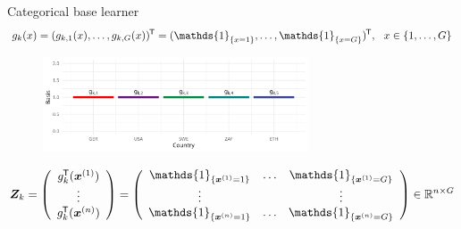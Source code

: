 \documentclass[t,10pt]{beamer}
\begin{document}


\begin{frame}{Categorical base learner}
  \vspace{-0.3cm}\[g_k(x) = (g_{k,1}(x), \dots, g_{k,G}(x))^\tran = (\mathds{1}_{\{x = 1\}}, \dots, \mathds{1}_{\{x = G\}})^\tran, \ \ x\in\{1, \dots, G\}\]
  \begin{center}
    \begin{figure}
      \includegraphics[width=0.7\textwidth]{figures/bs-cat/fig-cat0.png}
    \end{figure}
    \vspace{-0.5cm}
    \[
    \design_k = \left(\begin{array}{c}
      g_{k}^\tran(\xi[1]) \\
      \vdots \\
      g_{k}^\tran(\xi[n])
    \end{array}\right) = \left(\begin{array}{ccc}
      \mathds{1}_{\{\xi[1] = 1\}} & \dots & \mathds{1}_{\{\xi[1] = G\}} \\
      \vdots &  & \vdots \\
      \mathds{1}_{\{\xi[n] = 1\}} & \dots & \mathds{1}_{\{\xi[n] = G\}} \\
    \end{array}\right)\in\R^{n\times G}
    \]
  \end{center}

\end{frame}
\end{document}
